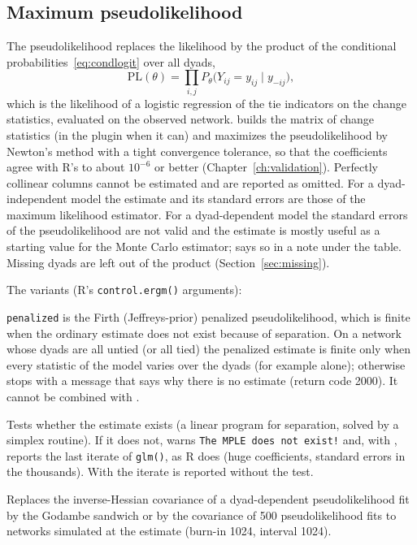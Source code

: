 \subsection{Maximum pseudolikelihood}\label{sec:mple}

The pseudolikelihood replaces the likelihood by the product of the conditional probabilities~\eqref{eq:condlogit} over all dyads,
\[
  \mathrm{PL}(\theta)=\prod_{i,j}P_\theta\bigl(Y_{ij}=y_{ij}\mid y_{-ij}\bigr),
\]
which is the likelihood of a logistic regression of the tie indicators on the change statistics, evaluated on the observed network. \nwergm{} builds the matrix of change statistics (in the plugin when it can) and maximizes the pseudolikelihood by Newton's method with a tight convergence tolerance, so that the coefficients agree with R's to about $10^{-6}$ or better (Chapter~\ref{ch:validation}). Perfectly collinear columns cannot be estimated and are reported as omitted. For a dyad-independent model the estimate and its standard errors are those of the maximum likelihood estimator. For a dyad-dependent model the standard errors of the pseudolikelihood are not valid and the estimate is mostly useful as a starting value for the Monte Carlo estimator; \nwergm{} says so in a note under the table. Missing dyads are left out of the product (Section~\ref{sec:missing}).

The variants (R's \texttt{control.ergm()} arguments):
\begin{description}[style=nextline,nosep]
  \item[\opt{mpletype(glm|penalized)} (\texttt{MPLE.type})] \texttt{penalized} is the Firth (Jeffreys-prior) penalized pseudolikelihood, which is finite when the ordinary estimate does not exist because of separation. On a network whose dyads are all untied (or all tied) the penalized estimate is finite only when every statistic of the model varies over the dyads (for example  alone); otherwise \nwergm{} stops with a message that says why there is no estimate (return code 2000). It cannot be combined with .
  \item[\opt{mplecheck(on|off)} (\texttt{MPLE.check})] Tests whether the estimate exists (a linear program for separation, solved by a simplex routine). If it does not, \nwergm{} warns \texttt{The MPLE does not exist!} and, with , reports the last iterate of \texttt{glm()}, as R does (huge coefficients, standard errors in the thousands). With  the iterate is reported without the test.
  \item[\opt{mplecovariance(invhess|godambe|bootstrap)} (\texttt{MPLE.covariance.method})] Replaces the inverse-Hessian covariance of a dyad-dependent pseudolikelihood fit by the Godambe sandwich or by the covariance of 500 pseudolikelihood fits to networks simulated at the estimate (burn-in 1024, interval 1024).
\end{description}

